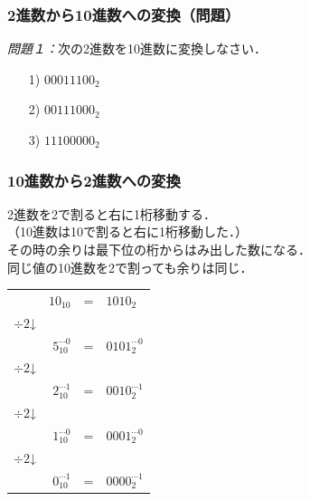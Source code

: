 \documentclass[handout]{beamer}        %
\begin{document}
\begin{frame}
  \frametitle{2進数から10進数への変換（問題）}

\emph{問題１：}次の2進数を10進数に変換しなさい．
\begin{enumerate}
\item[1)] $0001 1100_2$
\vfill
\item[2)] $0011 1000_2$
\vfill
\item[3)] $1110 0000_2$
\vfill
\end{enumerate}
\end{frame}

\begin{frame}
  \frametitle{10進数から2進数への変換}

  2進数を2で割ると右に1桁移動する．\\
  （10進数は10で割ると右に1桁移動した．）\\
  その時の余りは最下位の桁からはみ出した数になる．\\
  同じ値の10進数を2で割っても余りは同じ．

\begin{center}
\begin{tabular}{l r l l }
          & $10_{10}$ & = & $1010_2$                       \\
$\div 2$↓ &                   &                            \\
          & $5_{10}^{\cdots 0}$  & = & $0101_2^{\cdots 0}$ \\
$\div 2$↓ &                    &                           \\
          & $2_{10}^{\cdots 1}$  & = & $0010_2^{\cdots 1}$ \\
$\div 2$↓ &                    &                           \\
          & $1_{10}^{\cdots 0}$  & = & $0001_2^{\cdots 0}$ \\
$\div 2$↓ &                    &                           \\
          & $0_{10}^{\cdots 1}$  & = & $0000_2^{\cdots 1}$ \\
\end{tabular}
\end{center}
\end{frame}
\end{document}
